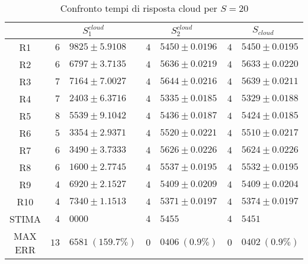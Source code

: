\begin{table}[!h]
\begin{tabular}{c|r@{.}l|r@{.}l|r@{.}l}
& \multicolumn{2}{|c|}{$S_1^{cloud}$}
& \multicolumn{2}{|c|}{$S_2^{cloud}$}
& \multicolumn{2}{|c}{$S_{cloud}$} 
\\          
\hline
R1      & $6$&$9825 \pm 5.9108$   & $4$&$5450 \pm 0.0196$ & $4$&$5450 \pm 0.0195$ \\
R2      & $6$&$6797 \pm 3.7135$   & $4$&$5636 \pm 0.0219$ & $4$&$5633 \pm 0.0220$ \\
R3      & $7$&$7164 \pm 7.0027$   & $4$&$5644 \pm 0.0216$ & $4$&$5639 \pm 0.0211$ \\
R4      & $7$&$2403 \pm 6.3716$   & $4$&$5335 \pm 0.0185$ & $4$&$5329 \pm 0.0188$ \\
R5      & $8$&$5539 \pm 9.1042$   & $4$&$5436 \pm 0.0187$ & $4$&$5424 \pm 0.0185$ \\
R6      & $5$&$3354 \pm 2.9371$   & $4$&$5520 \pm 0.0221$ & $4$&$5510 \pm 0.0217$ \\
R7      & $6$&$3490 \pm 3.7333$   & $4$&$5626 \pm 0.0226$ & $4$&$5624 \pm 0.0226$ \\
R8      & $6$&$1600 \pm 2.7745$   & $4$&$5537 \pm 0.0195$ & $4$&$5532 \pm 0.0195$ \\
R9      & $4$&$6920 \pm 2.1527$   & $4$&$5409 \pm 0.0209$ & $4$&$5409 \pm 0.0204$ \\
R10     & $4$&$7340 \pm 1.1513$   & $4$&$5371 \pm 0.0197$ & $4$&$5374 \pm 0.0197$ \\
STIMA   & $4$&$0000$              & $4$&$5455$            & $4$&$5451$            \\
MAX ERR & $13$&$6581 \ (159.7\%)$ & $0$&$0406 \ (0.9\%)$  & $0$&$0402 \ (0.9\%)$    
\end{tabular}
\centering
\caption{Confronto tempi di risposta cloud per $S=20$}
\label{tab:20_scloud}
\end{table}

